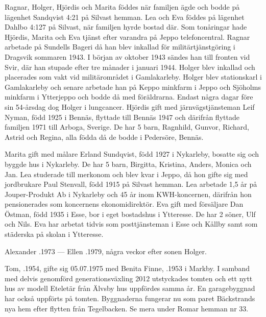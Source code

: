 Ragnar, Holger, Hjördis och Marita föddes när familjen ägde och bodde på lägenhet Sandqvist 4:21 på Silvast hemman. Lea och Eva föddes på lägenhet Dahlbo 4:127 på Silvast, när familjen hyrde bostad där. Som tonåringar hade Hjördis, Marita och Eva tjänst efter varandra på Jeppo telefoncentral. Ragnar arbetade på Sundells Bageri då han blev inkallad för militärtjänstgöring i Dragsvik sommaren 1943. I början av oktober 1943 sändes han till fronten vid Svir, där han stupade efter tre månader i januari 1944. Holger blev inkallad och placerades som vakt vid militärområdet i Gamlakarleby. Holger blev stationskarl i Gamlakarleby och senare arbetade han på Keppo minkfarm i Jeppo och Sjöholms minkfarm i Ytterjeppo och bodde då med föräldrarna. Endast några dagar före sin 54-årsdag dog Holger i lungcancer. Hjördis gift med järnvägstjänsteman Leif Nyman, född 1925 i Bennäs, flyttade till Bennäs 1947 och därifrån flyttade familjen 1971 till Arboga, Sverige. De har 5 barn, Ragnhild, Gunvor, Richard, Astrid och Regina, alla födda då de bodde i Pedersöre, Bennäs.

Marita gift med målare Erland Sundqvist, född 1927 i Nykarleby, bosatte sig och byggde hus i Nykarleby. De har 5 barn, Birgitta, Kristina, Anders, Monica och Jan. Lea studerade till merkonom och blev kvar i Jeppo, då hon gifte sig med jordbrukare Paul Stenvall, född 1915 på Silvast hemman. Lea arbetade 1,5 år på Jouper-Produkt Ab i Nykarleby och 45 år inom KWH-koncernen, därifrån hon pensionerades som koncernens ekonomidirektör. Eva gift med försäljare Dan Östman, född 1935 i Esse, bor i eget bostadshus i Ytteresse. De har 2 söner, Ulf och Nils. Eva har arbetat tidvis som posttjänsteman i Esse och Kållby samt som städerska på skolan i Ytteresse.

Alexander .1973  ---   Ellen .1979, några veckor efter sonen Holger.






Tom, .1954, gifte sig 05.07.1975 med Benita Finne, .1953 i Markby. I samband med delvis genomförd generationsväxling 2012 utstyckades tomten och ett nytt hus av modell Eteletär från Älvsby hus uppfördes samma år. En garagebyggnad har också uppförts på tomten. Byggnaderna fungerar nu som paret Bäckstrands nya hem efter flytten från Tegelbacken. Se mera under Romar hemman nr 33.


